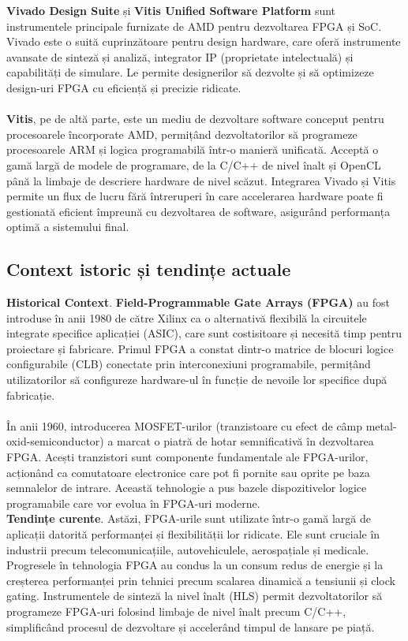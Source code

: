 \documentclass[12pt]{article}
\begin{document}
\hspace*{1cm}\textbf{Vivado Design Suite} și \textbf{Vitis Unified Software Platform} sunt instrumentele principale furnizate de AMD pentru dezvoltarea FPGA și SoC. Vivado este o suită cuprinzătoare pentru design hardware, care oferă instrumente avansate de sinteză și analiză, integrator IP (proprietate intelectuală) și capabilități de simulare. Le permite designerilor să dezvolte și să optimizeze design-uri FPGA cu eficiență și precizie ridicate.\\\\
\hspace*{1cm}\textbf{Vitis}, pe de altă parte, este un mediu de dezvoltare software conceput pentru procesoarele încorporate AMD, permițând dezvoltatorilor să programeze procesoarele ARM și logica programabilă într-o manieră unificată. Acceptă o gamă largă de modele de programare, de la C/C++ de nivel înalt și OpenCL până la limbaje de descriere hardware de nivel scăzut. Integrarea Vivado și Vitis permite un flux de lucru fără întreruperi în care accelerarea hardware poate fi gestionată eficient împreună cu dezvoltarea de software, asigurând performanța optimă a sistemului final.

\subsection{Context istoric și tendințe actuale}

\hspace*{1cm}\textbf{Historical Context}. \textbf{Field-Programmable Gate Arrays (FPGA)} au fost introduse în anii 1980 de către Xilinx ca o alternativă flexibilă la circuitele integrate specifice aplicației (ASIC), care sunt costisitoare și necesită timp pentru proiectare și fabricare. Primul FPGA a constat dintr-o matrice de blocuri logice configurabile (CLB) conectate prin interconexiuni programabile, permițând utilizatorilor să configureze hardware-ul în funcție de nevoile lor specifice după fabricație.\\\\
\hspace*{1cm}În anii 1960, introducerea MOSFET-urilor (tranzistoare cu efect de câmp metal-oxid-semiconductor) a marcat o piatră de hotar semnificativă în dezvoltarea FPGA. Acești tranzistori sunt componente fundamentale ale FPGA-urilor, acționând ca comutatoare electronice care pot fi pornite sau oprite pe baza semnalelor de intrare. Această tehnologie a pus bazele dispozitivelor logice programabile care vor evolua în FPGA-uri moderne.\\
\hspace*{1cm}\textbf{Tendințe curente}. Astăzi, FPGA-urile sunt utilizate într-o gamă largă de aplicații datorită performanței și flexibilității lor ridicate. Ele sunt cruciale în industrii precum telecomunicațiile, autovehiculele, aerospațiale și medicale. Progresele în tehnologia FPGA au condus la un consum redus de energie și la creșterea performanței prin tehnici precum scalarea dinamică a tensiunii și clock gating. Instrumentele de sinteză la nivel înalt (HLS) permit dezvoltatorilor să programeze FPGA-uri folosind limbaje de nivel înalt precum C/C++, simplificând procesul de dezvoltare și accelerând timpul de lansare pe piață.
\end{document}
